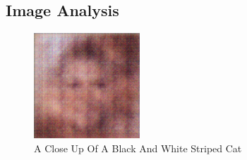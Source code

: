 \documentclass{article}%
\begin{document}
%
\subsection{Image Analysis}%
\label{subsec:ImageAnalysis}%


\begin{figure}[h!]%
\centering%
\includegraphics[width=150px]{500_fake_images/samples_5_64.png}%
\caption{A Close Up Of A Black And White Striped Cat}%
\end{figure}

%
\end{document}
